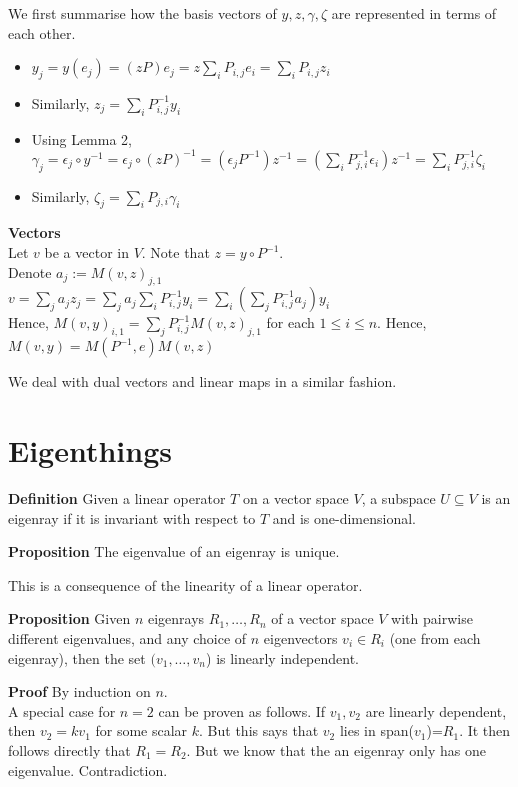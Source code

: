 \documentclass{article}
\begin{document}
We first summarise how the basis vectors of $y,z,\gamma,\zeta$ are represented in terms of each other.
\begin{itemize}
	\item $y_j=y(e_j)=(zP)e_j=z\sum_iP_{i,j}e_i=\sum_iP_{i,j}z_i$
	\item Similarly, $z_j=\sum_iP^{-1}_{i,j}y_i$
	\item Using Lemma 2, $\gamma_j=\epsilon_j\circ y^{-1}=\epsilon_j \circ (zP)^{-1} =(\epsilon_jP^{-1})z^{-1}= (\sum_iP^{-1}_{j,i}\epsilon_i)z^{-1}=\sum_i P^{-1}_{j,i}\zeta_i$
	\item Similarly, $\zeta_j=\sum_i P_{j,i}\gamma_i$
\end{itemize}

\textbf{Vectors}\\
Let $v$ be a vector in $V$. Note that $z=y\circ P^{-1}$.\\
Denote $a_j:=M(v,z)_{j,1}$\\
$v = \sum_j a_j z_j = \sum_j a_j \sum_i P^{-1}_{i,j} y_i = \sum_i (\sum_j P^{-1}_{i,j}a_j) y_i$\\
Hence, $M(v,y)_{i,1}=\sum_j P^{-1}_{i,j}M(v,z)_{j,1}$ for each $1\leq i\leq n$. Hence, $M(v,y) = M(P^{-1}, e)M(v,z)$

We deal with dual vectors and linear maps in a similar fashion.

\section{Eigenthings}
\textbf{Definition} Given a linear operator $T$ on a vector space $V$, a subspace $U\subseteq V$ is an eigenray if it is invariant with respect to $T$ and is one-dimensional. 

\textbf{Proposition} The eigenvalue of an eigenray is unique.

This is a consequence of the linearity of a linear operator.

\textbf{Proposition} Given $n$ eigenrays $R_1,\dots,R_n$ of a vector space $V$ with pairwise different eigenvalues, and any choice of $n$ eigenvectors $v_i\in R_i$ (one from each eigenray), then the set $(v_1,\dots,v_n$) is linearly independent.

\textbf{Proof} By induction on $n$.\\ 
A special case for $n=2$ can be proven as follows. If $v_1, v_2$ are linearly dependent, then $v_2=kv_1$ for some scalar $k$. But this says that $v_2$ lies in span($v_1$)=$R_1$. It then follows directly that $R_1 = R_2$. But we know that the an eigenray only has one eigenvalue. Contradiction.
\end{document}
